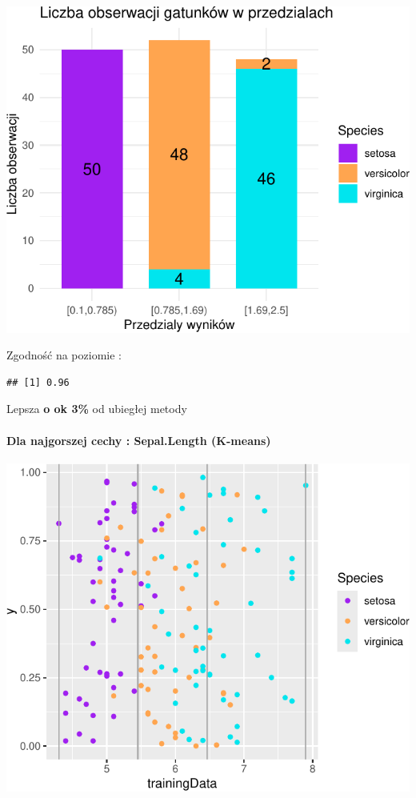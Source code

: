 \documentclass[
  12pt,
]{article}
\begin{document}
\begin{center}\includegraphics{Sprawozdanie2_files/figure-latex/tabela_kondygnacji_3_najl-1} \end{center}

Zgodność na poziomie :

\begin{verbatim}
## [1] 0.96
\end{verbatim}

Lepsza \textbf{o ok 3\%} od ubiegłej metody

\paragraph{Dla najgorszej cechy : Sepal.Length
(K-means)}\label{dla-najgorszej-cechy-sepal.length-k-means}

\begin{center}\includegraphics{Sprawozdanie2_files/figure-latex/kMeans_najg-1} \end{center}
\end{document}
